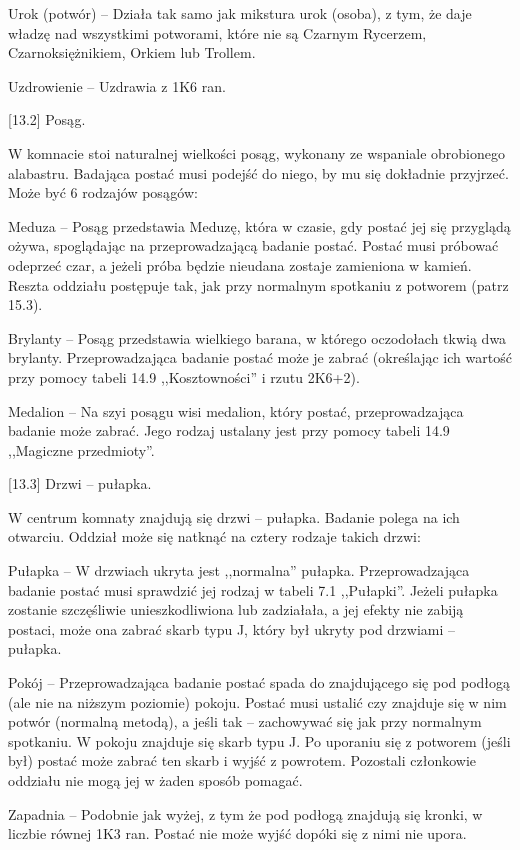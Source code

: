 Urok (potwór) – Działa tak samo jak mikstura urok (osoba), z tym, że daje władzę nad wszystkimi potworami, które nie są Czarnym Rycerzem, Czarnoksiężnikiem, Orkiem lub Trollem.

Uzdrowienie – Uzdrawia z 1K6 ran.

[13.2] Posąg.

W komnacie stoi naturalnej wielkości posąg, wykonany ze wspaniale obrobionego alabastru.
Badająca postać musi podejść do niego, by mu się dokładnie przyjrzeć.
Może być 6 rodzajów posągów:

Meduza – Posąg przedstawia Meduzę, która w czasie, gdy postać jej się przyglądą ożywa, spoglądając na przeprowadzającą badanie postać.
Postać musi próbować odeprzeć czar, a jeżeli próba będzie nieudana zostaje zamieniona w kamień.
Reszta oddziału postępuje tak, jak przy normalnym spotkaniu z potworem (patrz 15.3).

Brylanty – Posąg przedstawia wielkiego barana, w którego oczodołach tkwią dwa brylanty.
Przeprowadzająca badanie postać może je zabrać (określając ich wartość przy pomocy tabeli 14.9 ,,Kosztowności'' i rzutu 2K6+2).

Medalion – Na szyi posągu wisi medalion, który postać, przeprowadzająca badanie może zabrać.
Jego rodzaj ustalany jest przy pomocy tabeli 14.9 ,,Magiczne przedmioty''.

[13.3] Drzwi – pułapka.

W centrum komnaty znajdują się drzwi – pułapka.
Badanie polega na ich otwarciu.
Oddział może się natknąć na cztery rodzaje takich drzwi:

Pułapka – W drzwiach ukryta jest ,,normalna'' pułapka.
Przeprowadzająca badanie postać musi sprawdzić jej rodzaj w tabeli 7.1 ,,Pułapki''.
Jeżeli pułapka zostanie szczęśliwie unieszkodliwiona lub zadziałała, a jej efekty nie zabiją postaci, może ona zabrać skarb typu J, który był ukryty pod drzwiami – pułapka.

Pokój – Przeprowadzająca badanie postać spada do znajdującego się pod podłogą (ale nie na niższym poziomie) pokoju.
Postać musi ustalić czy znajduje się w nim potwór (normalną metodą), a jeśli tak – zachowywać się jak przy normalnym spotkaniu.
W pokoju znajduje się skarb typu J.
Po uporaniu się z potworem (jeśli był) postać może zabrać ten skarb i wyjść z powrotem.
Pozostali członkowie oddziału nie mogą jej w żaden sposób pomagać.

Zapadnia – Podobnie jak wyżej, z tym że pod podłogą znajdują się kronki, w liczbie równej 1K3 ran.
Postać nie może wyjść dopóki się z nimi nie upora.

